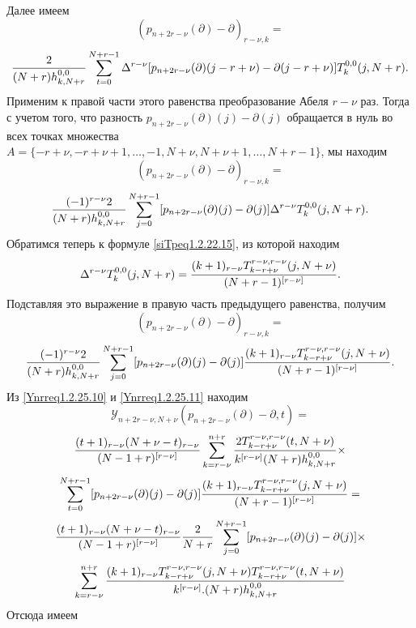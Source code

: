 Далее имеем
$$
(p_{n+2r-\nu}(\partial)-\partial)_{r-\nu,k}=
$$
$$
{2\over (N+r)h_{k,N+r}^{0,0}}\sum_{t=0}^{N+r-1}\Delta^{r-\nu}[p_{n+2r-\nu}(\partial)(j-r+\nu)-\partial(j-r+\nu)]T^{0,0}_k(j,N+r).
$$
Применим к правой части этого равенства преобразование Абеля $r-\nu$ раз. Тогда с учетом того, что разность  $p_{n+2r-\nu}(\partial)(j)-\partial(j)$
обращается в нуль во всех точках множества $A=\{-r+\nu,-r+\nu+1,\ldots,-1, N+\nu, N+\nu+1, \ldots, N+r-1\}$, мы находим
 $$
(p_{n+2r-\nu}(\partial)-\partial)_{r-\nu,k}=
$$
$$
{(-1)^{r-\nu}2\over (N+r)h_{k,N+r}^{0,0}}\sum_{j=0}^{N+r-1}[p_{n+2r-\nu}(\partial)(j)-\partial(j)]\Delta^{r-\nu}T^{0,0}_k(j,N+r).
$$
Обратимся теперь к формуле \eqref{siTpeq1.2.22.15}, из которой находим
$$
\Delta^{r-\nu}T^{0,0}_k(j,N+r)= {(k+1)_{r-\nu}T_{k-r+\nu}^{r-\nu,r-\nu}(j,N+\nu)\over (N+r-1)^{[r-\nu]}}.
$$
Подставляя это выражение в правую часть предыдущего равенства, получим
$$
(p_{n+2r-\nu}(\partial)-\partial)_{r-\nu,k}=
$$
\begin{equation}\label{Ynrreq1.2.25.11}
{(-1)^{r-\nu}2\over (N+r)h_{k,N+r}^{0,0}}\sum_{j=0}^{N+r-1}[p_{n+2r-\nu}(\partial)(j)-\partial(j)]{(k+1)_{r-\nu}T_{k-r+\nu}^{r-\nu,r-\nu}(j,N+\nu)\over (N+r-1)^{[r-\nu]}}.
\end{equation}
Из \eqref{Ynrreq1.2.25.10} и \eqref{Ynrreq1.2.25.11} находим
$$
\mathcal{Y}_{n+2r-\nu,N+\nu}(p_{n+2r-\nu}(\partial)-\partial,t)=
$$
$$
{(t+1)_{r-\nu}(N+\nu-t)_{r-\nu}\over (N-1+r)^{[r-\nu]}}
\sum_{k=r-\nu}^{n+r} {2T_{k-r+\nu}^{r-\nu,r-\nu}(t,N+\nu)\over k^{[r-\nu]}
 (N+r)h_{k,N+r}^{0,0}}\times
 $$
$$
\sum_{t=0}^{N+r-1}[p_{n+2r-\nu}(\partial)(j)-\partial(j)]{(k+1)_{r-\nu}T_{k-r+\nu}^{r-\nu,r-\nu}(j,N+\nu)\over (N+r-1)^{[r-\nu]}}=
$$
$$
{(t+1)_{r-\nu}(N+\nu-t)_{r-\nu}\over (N-1+r)^{[r-\nu]}}{2\over N+r}\sum_{j=0}^{N+r-1}[p_{n+2r-\nu}(\partial)(j)-\partial(j)]\times
$$
$$
\sum_{k=r-\nu}^{n+r} {(k+1)_{r-\nu}T_{k-r+\nu}^{r-\nu,r-\nu}(j,N+\nu)T_{k-r+\nu}^{r-\nu,r-\nu}(t,N+\nu)\over k^{[r-\nu]}.
 (N+r)h_{k,N+r}^{0,0}}
$$
Отсюда имеем

